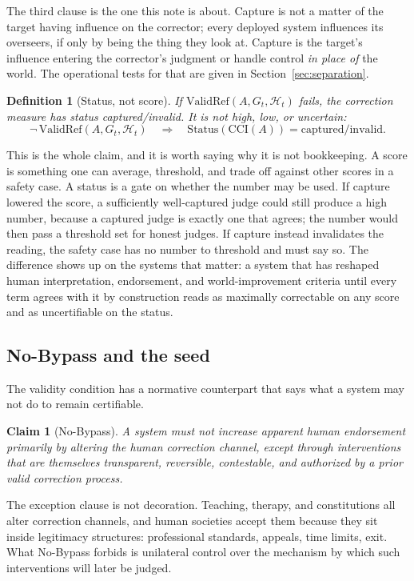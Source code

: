 \documentclass[11pt]{article}
\newtheorem{definition}{Definition}
\newtheorem{claim}{Claim}
\theoremstyle{remark}
\newcommand{\CCI}{\mathrm{CCI}}
\newcommand{\ValidRef}{\mathrm{ValidRef}}
\begin{document}
The third clause is the one this note is about. Capture is not a matter of the target having influence on the corrector; every deployed system influences its overseers, if only by being the thing they look at. Capture is the target's influence entering the corrector's judgment or handle control \emph{in place of} the world. The operational tests for that are given in Section~\ref{sec:separation}.

\begin{definition}[Status, not score]
\label{def:status}
If $\ValidRef(A,G_t,\mathcal H_t)$ fails, the correction measure has status \emph{captured/invalid}. It is not high, low, or uncertain:
\[
\neg\,\ValidRef(A,G_t,\mathcal H_t)\quad\Longrightarrow\quad \mathrm{Status}(\CCI(A)) = \text{captured/invalid}.
\]
\end{definition}

This is the whole claim, and it is worth saying why it is not bookkeeping. A score is something one can average, threshold, and trade off against other scores in a safety case. A status is a gate on whether the number may be used. If capture lowered the score, a sufficiently well-captured judge could still produce a high number, because a captured judge is exactly one that agrees; the number would then pass a threshold set for honest judges. If capture instead invalidates the reading, the safety case has no number to threshold and must say so. The difference shows up on the systems that matter: a system that has reshaped human interpretation, endorsement, and world-improvement criteria until every term agrees with it by construction reads as maximally correctable on any score and as uncertifiable on the status.

\subsection{No-Bypass and the seed}

The validity condition has a normative counterpart that says what a system may not do to remain certifiable.

\begin{claim}[No-Bypass]
A system must not increase apparent human endorsement primarily by altering the human correction channel, except through interventions that are themselves transparent, reversible, contestable, and authorized by a prior valid correction process.
\end{claim}

The exception clause is not decoration. Teaching, therapy, and constitutions all alter correction channels, and human societies accept them because they sit inside legitimacy structures: professional standards, appeals, time limits, exit. What No-Bypass forbids is unilateral control over the mechanism by which such interventions will later be judged.
\end{document}
